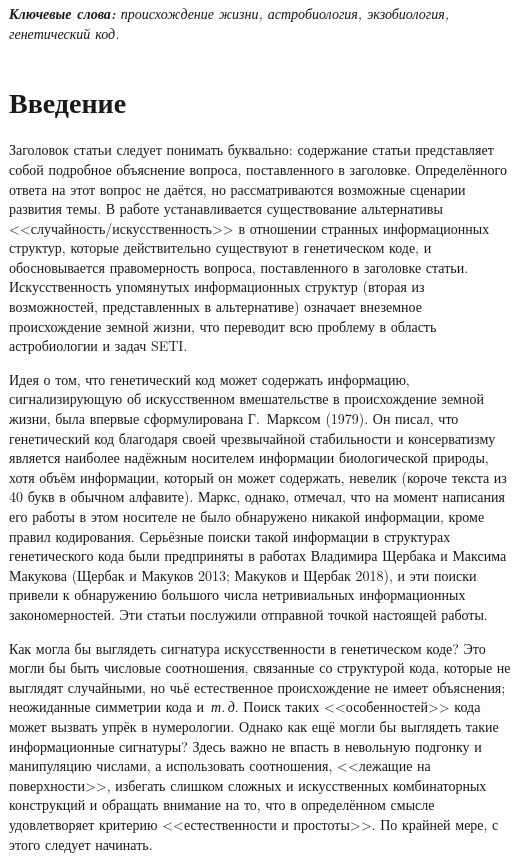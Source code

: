 \documentclass[12pt]{article}
\begin{document}
\medskip
\noindent\textit{\textbf{Ключевые слова:} происхождение жизни, астробиология, экзобиология, генетический код.}

\setcounter{page}{23}

\section{Введение}

Заголовок статьи следует понимать буквально: содержание статьи представляет собой подробное объяснение вопроса, поставленного в заголовке. Определённого ответа на этот вопрос не даётся, но рассматриваются возможные сценарии развития темы. В работе устанавливается существование альтернативы <<случайность/искусственность>> в отношении странных информационных структур, которые действительно существуют в генетическом коде, и обосновывается правомерность вопроса, поставленного в заголовке статьи. Искусственность упомянутых информационных структур (вторая из возможностей, представленных в альтернативе) означает внеземное происхождение земной жизни, что переводит всю проблему в область астробиологии и задач SETI.

Идея о том, что генетический код может содержать информацию, сигнализирующую об искусственном вмешательстве в происхождение земной жизни, была впервые сформулирована Г.~Марксом (1979). Он писал, что генетический код благодаря своей чрезвычайной стабильности и консерватизму является наиболее надёжным носителем информации биологической природы, хотя объём информации, который он может содержать, невелик (короче текста из 40 букв в обычном алфавите). Маркс, однако, отмечал, что на момент написания его работы в этом носителе не было обнаружено никакой информации, кроме правил кодирования. Серьёзные поиски такой информации в структурах генетического кода были предприняты в работах Владимира Щербака и Максима Макукова (Щербак и Макуков 2013; Макуков и Щербак 2018), и эти поиски привели к обнаружению большого числа нетривиальных информационных закономерностей. Эти статьи послужили отправной точкой настоящей работы.

Как могла бы выглядеть сигнатура искусственности в генетическом коде? Это могли бы быть числовые соотношения, связанные со структурой кода, которые не выглядят случайными, но чьё естественное происхождение не имеет объяснения; неожиданные симметрии кода и~\textit{т.\,д}. Поиск таких <<особенностей>> кода может вызвать упрёк в нумерологии. Однако как ещё могли бы выглядеть такие информационные сигнатуры? Здесь важно не впасть в невольную подгонку и манипуляцию числами, а использовать соотношения, <<лежащие на поверхности>>, избегать слишком сложных и искусственных комбинаторных конструкций и обращать внимание на то, что в определённом смысле удовлетворяет критерию <<естественности и простоты>>. По крайней мере, с этого следует начинать.
\end{document}
